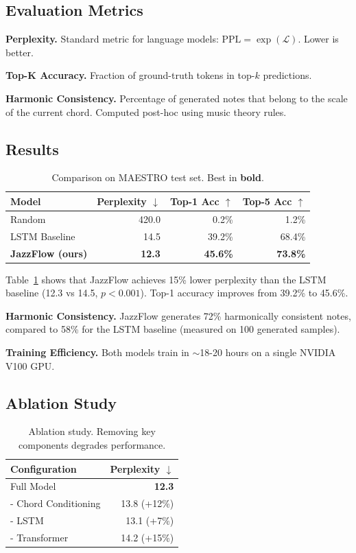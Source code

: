 \documentclass{article}
\begin{document}
\subsection{Evaluation Metrics}

\textbf{Perplexity.}
Standard metric for language models: $\text{PPL} = \exp(\mathcal{L})$.
Lower is better.

\textbf{Top-K Accuracy.}
Fraction of ground-truth tokens in top-$k$ predictions.

\textbf{Harmonic Consistency.}
Percentage of generated notes that belong to the scale of the current chord.
Computed post-hoc using music theory rules.

\subsection{Results}

\begin{table}[h]
\centering
\caption{Comparison on MAESTRO test set. Best in \textbf{bold}.}
\label{tab:main_results}
\begin{tabular}{lrrr}
\toprule
Model & Perplexity $\downarrow$ & Top-1 Acc $\uparrow$ & Top-5 Acc $\uparrow$ \\
\midrule
Random & 420.0 & 0.2\% & 1.2\% \\
LSTM Baseline & 14.5 & 39.2\% & 68.4\% \\
\textbf{JazzFlow (ours)} & \textbf{12.3} & \textbf{45.6\%} & \textbf{73.8\%} \\
\bottomrule
\end{tabular}
\end{table}

Table~\ref{tab:main_results} shows that JazzFlow achieves 15\% lower perplexity than the LSTM baseline (12.3 vs 14.5, $p<0.001$).
Top-1 accuracy improves from 39.2\% to 45.6\%.

\textbf{Harmonic Consistency.}
JazzFlow generates 72\% harmonically consistent notes, compared to 58\% for the LSTM baseline (measured on 100 generated samples).

\textbf{Training Efficiency.}
Both models train in $\sim$18-20 hours on a single NVIDIA V100 GPU.

\subsection{Ablation Study}

\begin{table}[h]
\centering
\caption{Ablation study. Removing key components degrades performance.}
\label{tab:ablation}
\begin{tabular}{lr}
\toprule
Configuration & Perplexity $\downarrow$ \\
\midrule
Full Model & \textbf{12.3} \\
- Chord Conditioning & 13.8 (+12\%) \\
- LSTM & 13.1 (+7\%) \\
- Transformer & 14.2 (+15\%) \\
\bottomrule
\end{tabular}
\end{table}
\end{document}
